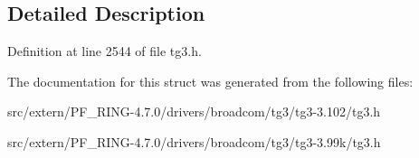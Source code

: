 \subsection{Detailed Description}


Definition at line 2544 of file tg3.h.



The documentation for this struct was generated from the following files:\begin{DoxyCompactItemize}
\item 
src/extern/PF\_\-RING-\/4.7.0/drivers/broadcom/tg3/tg3-\/3.102/tg3.h\item 
src/extern/PF\_\-RING-\/4.7.0/drivers/broadcom/tg3/tg3-\/3.99k/tg3.h\end{DoxyCompactItemize}
